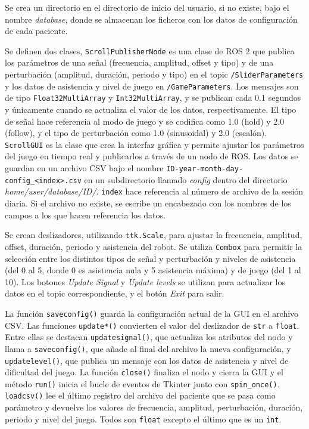 Se crea un directorio en el directorio de inicio del usuario, si no existe, bajo el nombre \textit{database}, donde se almacenan los ficheros con los datos de configuración de cada paciente.

Se definen dos clases, \verb|ScrollPublisherNode| es una clase de ROS 2 que publica los parámetros de una señal (frecuencia, amplitud, offset y tipo) y de una perturbación (amplitud, duración, periodo y tipo) en el topic \verb|/SliderParameters| y los datos de asistencia y nivel de juego en \verb|/GameParameters|.
Los mensajes son de tipo \verb|Float32MultiArray| y \verb|Int32MultiArray|, y se publican cada 0.1 segundos y únicamente cuando se actualiza el valor de los datos, respectivamente.
El tipo de señal hace referencia al modo de juego y se codifica como 1.0 (hold) y 2.0 (follow), y el tipo de perturbación como 1.0 (sinusoidal) y 2.0 (escalón).
\verb|ScrollGUI| es la clase que crea la interfaz gráfica y permite ajustar los parámetros del juego en tiempo real y publicarlos a través de un nodo de ROS.
Los datos se guardan en un archivo CSV bajo el nombre \verb|ID-year-month-day-config_<index>.csv| en un subdirectorio llamado \textit{config} dentro del directorio \textit{home/user/database/ID/}.
\verb|index| hace referencia al número de archivo de la sesión diaria.
Si el archivo no existe, se escribe un encabezado con los nombres de los campos a los que hacen referencia los datos.

Se crean deslizadores, utilizando \verb|ttk.Scale|, para ajustar la frecuencia, amplitud, offset, duración, periodo y asistencia del robot.
Se utiliza \verb|Combox| para permitir la selección entre los distintos tipos de señal y perturbación y niveles de asistencia (del 0 al 5, donde 0 es asistencia nula y 5 asistencia máxima) y de juego (del 1 al 10).
Los botones \textit{Update Signal} y \textit{Update levels} se utilizan para actualizar los datos en el topic correspondiente, y el botón \textit{Exit} para salir.

La función \verb|saveconfig()| guarda la configuración actual de la GUI en el archivo CSV.
Las funciones \verb|update*()| convierten el valor del deslizador de \verb|str| a \verb|float|.
Entre ellas se destacan \verb|updatesignal()|, que actualiza los atributos del nodo y llama a \verb|saveconfig()|, que añade al final del archivo la nueva configuración, y \verb|updatelevel()|, que publica un mensaje con los datos de asistencia y nivel de dificultad del juego.
La función \verb|close()| finaliza el nodo y cierra la GUI y el método \verb|run()| inicia el bucle de eventos de Tkinter junto con \verb|spin_once()|.
\verb|loadcsv()| lee el último registro del archivo del paciente que se pasa como parámetro y devuelve los valores de frecuencia, amplitud, perturbación, duración, periodo y nivel del juego.
Todos son \verb|float| excepto el último que es un \verb|int|.

